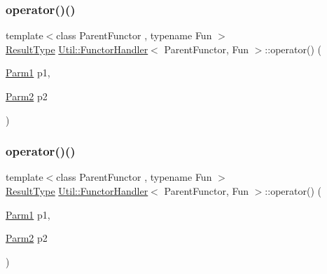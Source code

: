 \mbox{\label{classUtil_1_1FunctorHandler_a464269162477cf2b95690d94ec3fa02c}} 
\subsubsection{\texorpdfstring{operator()()}{operator()()}\hspace{0.1cm}{\footnotesize\ttfamily [7/18]}}
{\footnotesize\ttfamily template$<$class Parent\+Functor , typename Fun $>$ \\
\mbox{\hyperlink{classUtil_1_1FunctorHandler_a036da44b8cc2567704cebd2a20d16c80}{Result\+Type}} \mbox{\hyperlink{classUtil_1_1FunctorHandler}{Util\+::\+Functor\+Handler}}$<$ Parent\+Functor, Fun $>$\+::operator() (\begin{DoxyParamCaption}\item[{\mbox{\hyperlink{classUtil_1_1FunctorHandler_a0a902ba40a0ab746f1c29a81d68ae0db}{Parm1}}}]{p1,  }\item[{\mbox{\hyperlink{classUtil_1_1FunctorHandler_a5fb5374c316f8ac252aa22fcdf7d21a7}{Parm2}}}]{p2 }\end{DoxyParamCaption})\hspace{0.3cm}{\ttfamily [inline]}}

\mbox{\label{classUtil_1_1FunctorHandler_a464269162477cf2b95690d94ec3fa02c}} 
\subsubsection{\texorpdfstring{operator()()}{operator()()}\hspace{0.1cm}{\footnotesize\ttfamily [8/18]}}
{\footnotesize\ttfamily template$<$class Parent\+Functor , typename Fun $>$ \\
\mbox{\hyperlink{classUtil_1_1FunctorHandler_a036da44b8cc2567704cebd2a20d16c80}{Result\+Type}} \mbox{\hyperlink{classUtil_1_1FunctorHandler}{Util\+::\+Functor\+Handler}}$<$ Parent\+Functor, Fun $>$\+::operator() (\begin{DoxyParamCaption}\item[{\mbox{\hyperlink{classUtil_1_1FunctorHandler_a0a902ba40a0ab746f1c29a81d68ae0db}{Parm1}}}]{p1,  }\item[{\mbox{\hyperlink{classUtil_1_1FunctorHandler_a5fb5374c316f8ac252aa22fcdf7d21a7}{Parm2}}}]{p2 }\end{DoxyParamCaption})\hspace{0.3cm}{\ttfamily [inline]}}


